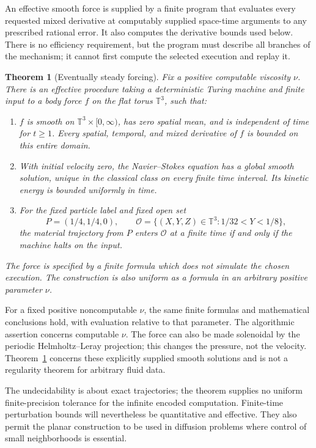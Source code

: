 \documentclass[11pt]{article}
\newtheorem{theorem}{Theorem}[section]
\theoremstyle{remark}\newtheorem{remark}[theorem]{Remark}
\begin{document}
An effective smooth force is supplied by a finite program that evaluates
every requested mixed derivative at computably supplied space-time
arguments to any prescribed rational error. It also computes the
derivative bounds used below. There is no efficiency requirement, but
the program must describe all branches of the mechanism; it cannot
first compute the selected execution and replay it.

\begin{theorem}[Eventually steady forcing]\label{thm:main}
Fix a positive computable viscosity $\nu$.  There is an effective
procedure taking a deterministic Turing machine and finite input to
a body force $f$ on the flat torus $\mathbb T^3$, such that:
\begin{enumerate}
\item $f$ is smooth on $\mathbb T^3\times[0,\infty)$, has zero
spatial mean, and is independent of time for $t\ge1$.  Every spatial,
temporal, and mixed derivative of $f$ is bounded on this entire domain.
\item With initial velocity zero, the Navier--Stokes equation has a
global smooth solution, unique in the classical class on every finite
time interval.  Its kinetic energy is bounded uniformly in time.
\item For the fixed particle label and fixed open set
\[
 P=(1/4,1/4,0),\qquad
 \mathcal O=\{(X,Y,Z)\in\mathbb T^3:1/32<Y<1/8\},
\]
the material trajectory from $P$ enters $\mathcal O$ at a finite
time if and only if the machine halts on the input.
\end{enumerate}
The force is specified by a finite formula which does not simulate the
chosen execution.  The construction is also uniform as a formula in
an arbitrary positive parameter $\nu$.
\end{theorem}
For a fixed positive noncomputable $\nu$, the same finite formulas and
mathematical conclusions hold, with evaluation relative to that
parameter. The algorithmic assertion concerns computable $\nu$.
The force can also be made solenoidal by the periodic
Helmholtz--Leray projection; this changes the pressure, not the velocity.
Theorem~\ref{thm:main} concerns these explicitly supplied smooth
solutions and is not a regularity theorem for arbitrary fluid data.

The undecidability is about exact trajectories; the theorem supplies no
uniform finite-precision tolerance for the infinite encoded computation.
Finite-time perturbation bounds will nevertheless be quantitative and
effective. They also permit the planar construction to be used in
diffusion problems where control of small neighborhoods is essential.
\end{document}

